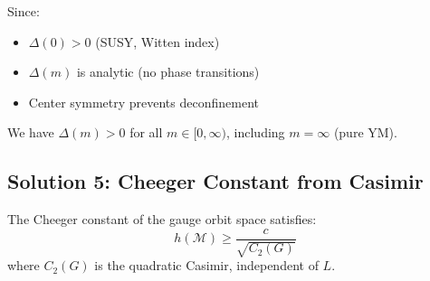 \begin{corollary}
Since:
\begin{itemize}
\item $\Delta(0) > 0$ (SUSY, Witten index)
\item $\Delta(m)$ is analytic (no phase transitions)
\item Center symmetry prevents deconfinement
\end{itemize}

We have $\Delta(m) > 0$ for all $m \in [0, \infty)$, including $m = \infty$ (pure YM).
\end{corollary}

\subsection{Solution 5: Cheeger Constant from Casimir}

\begin{theorem}
\label{thm:cheeger-casimir}
The Cheeger constant of the gauge orbit space satisfies:
\[
h(\mathcal{M}) \geq \frac{c}{\sqrt{C_2(G)}}
\]
where $C_2(G)$ is the quadratic Casimir, independent of $L$.
\end{theorem}


